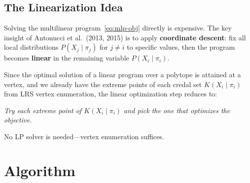 \documentclass[11pt]{article}
\begin{document}
\subsection{The Linearization Idea}

Solving the multilinear program~\eqref{eq:mlp-obj} directly is expensive. The key insight
of Antonucci et al.\ (2013, 2015) is to apply \textbf{coordinate descent}: fix all local
distributions $P(X_j \mid \pi_j)$ for $j \neq i$ to specific values, then the program becomes
\textbf{linear} in the remaining variable $P(X_i \mid \pi_i)$.

Since the optimal solution of a linear program over a polytope is attained at a vertex,
and we already have the extreme points of each credal set $K(X_i \mid \pi_i)$ from LRS vertex
enumeration, the linear optimization step reduces to:

\begin{center}
\emph{Try each extreme point of $K(X_i \mid \pi_i)$ and pick the one that optimizes the objective.}
\end{center}

No LP solver is needed---vertex enumeration suffices.

\section{Algorithm}
\end{document}
